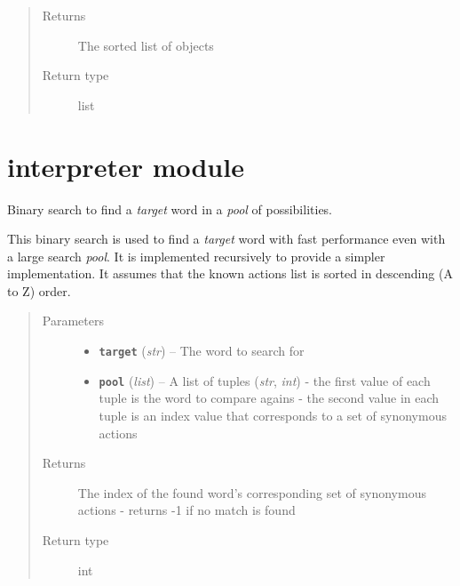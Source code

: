 \documentclass[letterpaper,10pt,english]{sphinxmanual}
\begin{document}
\begin{fulllineitems}
\begin{description}
\end{description}
\begin{quote}\begin{description}
\item[{Returns}] \leavevmode
The sorted list of  objects

\item[{Return type}] \leavevmode
list

\end{description}\end{quote}

\end{fulllineitems}



\chapter{interpreter module}
\label{interpreter:interpreter-module}\label{interpreter::doc}\label{interpreter:module-interpreter.interpreter}

\begin{fulllineitems}
\label{interpreter:interpreter.interpreter.binary_search_actions}
Binary search to find a \emph{target} word in a \emph{pool} of possibilities.

This binary search is used to find a \emph{target} word with fast performance even with a large search \emph{pool}. It is implemented recursively to provide a simpler implementation. It assumes that the known actions list is sorted in descending (A to Z) order.
\begin{quote}\begin{description}
\item[{Parameters}] \leavevmode\begin{itemize}
\item {} 
\textbf{\texttt{target}} (\emph{str}) -- The word to search for

\item {} 
\textbf{\texttt{pool}} (\emph{list}) -- A list of tuples (\emph{str}, \emph{int}) - the first value of each tuple is the word to compare agains - the second value in each tuple is an index value that corresponds to a set of synonymous actions

\end{itemize}

\item[{Returns}] \leavevmode
The index of the found word's corresponding set of synonymous actions - returns -1 if no match is found

\item[{Return type}] \leavevmode
int

\end{description}\end{quote}

\end{fulllineitems}
\end{document}

